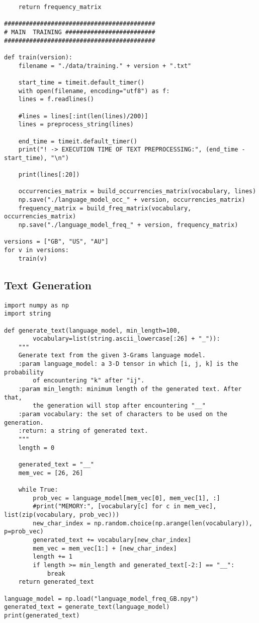 \documentclass[
12pt,
a4paper,
oneside,
headinclude,
footinclude]{article}
\theoremstyle{definition} %
\begin{document}
\begin{verbatim}
    return frequency_matrix

##########################################
# MAIN  TRAINING #########################
##########################################

def train(version):
    filename = "./data/training." + version + ".txt"
    
    start_time = timeit.default_timer()
    with open(filename, encoding="utf8") as f:
    lines = f.readlines()
    
    #lines = lines[:int(len(lines)/200)]
    lines = preprocess_string(lines)
        
    end_time = timeit.default_timer()
    print("! -> EXECUTION TIME OF TEXT PREPROCESSING:", (end_time - start_time), "\n")
    
    print(lines[:20])
    
    occurrencies_matrix = build_occurrencies_matrix(vocabulary, lines)
    np.save("./language_model_occ_" + version, occurrencies_matrix)
    frequency_matrix = build_freq_matrix(vocabulary, occurrencies_matrix)
    np.save("./language_model_freq_" + version, frequency_matrix)

versions = ["GB", "US", "AU"]
for v in versions:
    train(v)   
\end{verbatim}    

\subsection{Text Generation}
\begin{verbatim}
import numpy as np
import string

def generate_text(language_model, min_length=100, 
        vocabulary=list(string.ascii_lowercase[:26] + "_")):
    """
    Generate text from the given 3-Grams language model.
    :param language_model: a 3-D tensor in which [i, j, k] is the probability 
        of encountering "k" after "ij".
    :param min_length: minimum length of the generated text. After that, 
        the generation will stop after encountering "__"
    :param vocabulary: the set of characters to be used on the generation.
    :return: a string of generated text.
    """
    length = 0
    
    generated_text = "__"
    mem_vec = [26, 26]
    
    while True:
        prob_vec = language_model[mem_vec[0], mem_vec[1], :]
        #print("MEMORY:", [vocabulary[c] for c in mem_vec], list(zip(vocabulary, prob_vec)))
        new_char_index = np.random.choice(np.arange(len(vocabulary)), p=prob_vec)
        generated_text += vocabulary[new_char_index]
        mem_vec = mem_vec[1:] + [new_char_index]
        length += 1
        if length >= min_length and generated_text[-2:] == "__":
            break
    return generated_text

language_model = np.load("language_model_freq_GB.npy")
generated_text = generate_text(language_model)
print(generated_text)
\end{verbatim}
\end{document}
